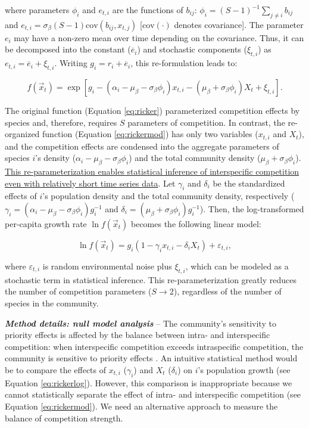 \documentclass[12pt, class=article, crop=false]{standalone}
\begin{document}
where parameters $\phi_{i}$ and $e_{t,i}$ are the functions of $b_{ij}$: $\phi_i = (S-1)^{-1}\sum_{j \ne i} b_{ij}$ and $e_{t,i} = \sigma_{\beta} (S - 1) \mbox{cov}(b_{ij}, x_{t,j})$ [$\mbox{cov}(\cdot)$ denotes covariance].
The parameter $e_i$ may have a non-zero mean over time depending on the covariance.
Thus, it can be decomposed into the constant ($\overline{e}_i$) and stochastic components ($\xi_{t,i}$) as $e_{t,i} = \overline{e}_i + \xi_{t,i}$.
Writing $g_{i} = r_i + \overline{e}_i$, this re-formulation leads to:

\begin{equation}
\label{eq:rickermod}
    f(\overset{\rightarrow}{x}_{t}) = \exp\left[g_{i} - (\alpha_i - \mu_{\beta} - \sigma_{\beta} \phi_i) x_{t,i} - (\mu_{\beta} +  \sigma_{\beta} \phi_i) X_t + \xi_{t,i} \right].
\end{equation}

The original function (Equation \ref{eq:ricker}) parameterized competition effects by species and, therefore, requires $S$ parameters of competition.
In contrast, the re-organized function (Equation \ref{eq:rickermod}) has only two variables ($x_{t,i}$ and $X_t$), and the competition effects are condensed into the aggregate parameters of species $i$'s density ($\alpha_i - \mu_{\beta} - \sigma_{\beta} \phi_i$) and the total community density ($\mu_{\beta} + \sigma_{\beta} \phi_i$).
\ul{This re-parameterization enables statistical inference of interspecific competition even with relatively short time series data}.
Let $\gamma_i$ and $\delta_i$ be the standardized effects of $i$'s population density and the total community density, respectively ($\gamma_i = (\alpha_i - \mu_{\beta} - \sigma_{\beta} \phi_i)g_i^{-1}$ and $\delta_i = (\mu_{\beta} + \sigma_{\beta} \phi_i)g_i^{-1}$).
Then, the log-transformed per-capita growth rate $\ln f(\overset{\rightarrow}{x}_{t})$ becomes the following linear model:

\begin{equation}
\label{eq:rickerlog}
    \ln f(\overset{\rightarrow}{x}_{t}) = g_i (1 - \gamma_i x_{t,i} - \delta_i X_t) + \varepsilon_{t,i},
\end{equation}

where $\varepsilon_{t,i}$ is random environmental noise plus $\xi_{t,i}$, which can be modeled as a stochastic term in statistical inference. This re-parameterization greatly reduces the number of competition parameters ($S \rightarrow 2$), regardless of the number of species in the community.

\textbf{\textit{Method details: null model analysis}} --
The community's sensitivity to priority effects is affected by the balance between intra- and interspecific competition: when interspecific competition exceeds intraspecific competition, the community is sensitive to priority effects \citep{ke_coexistence_2018}.
An intuitive statistical method would be to compare the effects of $x_{t,i}$ ($\gamma_i$) and $X_t$ ($\delta_i$) on $i$'s population growth (see Equation \ref{eq:rickerlog}).
However, this comparison is inappropriate because we cannot statistically separate the effect of intra- and interspecific competition (see Equation \ref{eq:rickermod}).
We need an alternative approach to measure the balance of competition strength.
\end{document}
